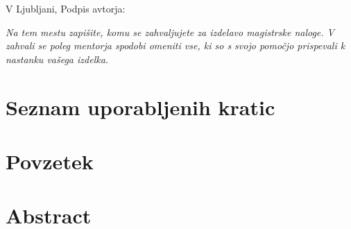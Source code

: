 \documentclass[a4paper, 12pt]{book}
\newcommand{\clearemptydoublepage}{\newpage{\pagestyle{empty}\cleardoublepage}}
\begin{document}
\vspace{1cm}
\noindent V Ljubljani, \tfinishedDate \hfill Podpis avtorja:

\clearemptydoublepage

\thispagestyle{empty}\mbox{}\vfill\null\it%
Na tem mestu zapišite, komu se zahvaljujete za izdelavo magistrske naloge. V zahvali se poleg mentorja spodobi omeniti vse, ki so s svojo pomočjo prispevali k nastanku vašega izdelka.

\rm\normalfont

\clearemptydoublepage

\def\thepage{}%
\tableofcontents{}


\clearemptydoublepage


\chapter*{Seznam uporabljenih kratic}





\clearemptydoublepage

\chapter*{Povzetek}

\clearemptydoublepage

\chapter*{Abstract}

\clearemptydoublepage

\mainmatter
\setcounter{page}{1}
\pagestyle{fancy}



\printbibliography
\end{document}
